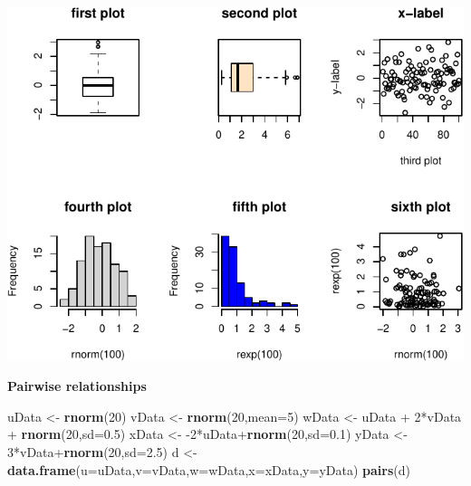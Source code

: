 \documentclass[]{article}
\newenvironment{Shaded}{\begin{snugshade}}{\end{snugshade}}
\newcommand{\KeywordTok}[1]{\textcolor[rgb]{0.13,0.29,0.53}{\textbf{{#1}}}}
\newcommand{\DataTypeTok}[1]{\textcolor[rgb]{0.13,0.29,0.53}{{#1}}}
\newcommand{\DecValTok}[1]{\textcolor[rgb]{0.00,0.00,0.81}{{#1}}}
\newcommand{\FloatTok}[1]{\textcolor[rgb]{0.00,0.00,0.81}{{#1}}}
\newcommand{\StringTok}[1]{\textcolor[rgb]{0.31,0.60,0.02}{{#1}}}
\newcommand{\NormalTok}[1]{{#1}}
\numberwithin{equation}{section}
\begin{document}
\includegraphics{index_files/figure-latex/unnamed-chunk-82-1.pdf}

\textbf{Pairwise relationships}

\begin{Shaded}
\begin{Highlighting}[]
\NormalTok{uData <-}\StringTok{ }\KeywordTok{rnorm}\NormalTok{(}\DecValTok{20}\NormalTok{)}
\NormalTok{vData <-}\StringTok{ }\KeywordTok{rnorm}\NormalTok{(}\DecValTok{20}\NormalTok{,}\DataTypeTok{mean=}\DecValTok{5}\NormalTok{)}
\NormalTok{wData <-}\StringTok{ }\NormalTok{uData +}\StringTok{ }\DecValTok{2}\NormalTok{*vData +}\StringTok{ }\KeywordTok{rnorm}\NormalTok{(}\DecValTok{20}\NormalTok{,}\DataTypeTok{sd=}\FloatTok{0.5}\NormalTok{)}
\NormalTok{xData <-}\StringTok{ }\NormalTok{-}\DecValTok{2}\NormalTok{*uData+}\KeywordTok{rnorm}\NormalTok{(}\DecValTok{20}\NormalTok{,}\DataTypeTok{sd=}\FloatTok{0.1}\NormalTok{)}
\NormalTok{yData <-}\StringTok{ }\DecValTok{3}\NormalTok{*vData+}\KeywordTok{rnorm}\NormalTok{(}\DecValTok{20}\NormalTok{,}\DataTypeTok{sd=}\FloatTok{2.5}\NormalTok{)}
\NormalTok{d <-}\StringTok{ }\KeywordTok{data.frame}\NormalTok{(}\DataTypeTok{u=}\NormalTok{uData,}\DataTypeTok{v=}\NormalTok{vData,}\DataTypeTok{w=}\NormalTok{wData,}\DataTypeTok{x=}\NormalTok{xData,}\DataTypeTok{y=}\NormalTok{yData)}
\KeywordTok{pairs}\NormalTok{(d)}
\end{Highlighting}
\end{Shaded}
\end{document}
